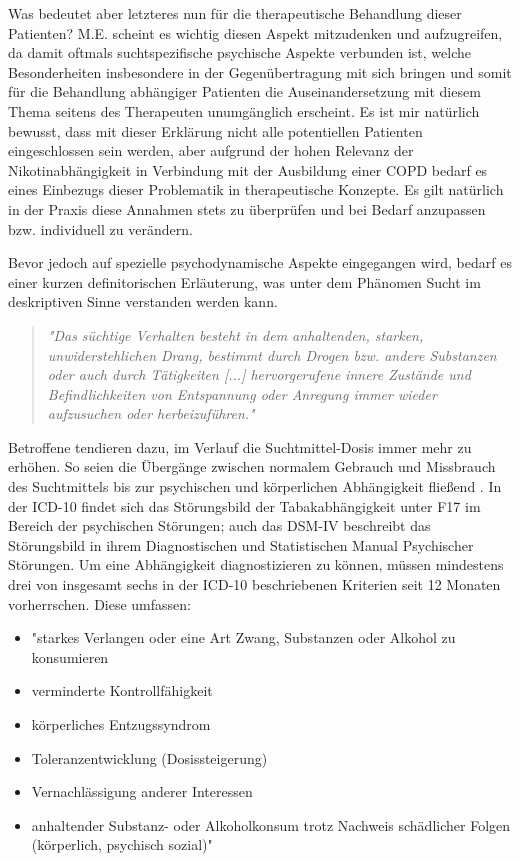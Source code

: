 Was bedeutet aber letzteres nun für die therapeutische Behandlung dieser Patienten? M.E. scheint es wichtig diesen Aspekt mitzudenken und aufzugreifen, da damit oftmals  suchtspezifische psychische Aspekte verbunden ist, welche Besonderheiten insbesondere in der Gegenübertragung mit sich bringen und somit für die Behandlung abhängiger Patienten die Auseinandersetzung mit diesem Thema seitens des Therapeuten unumgänglich erscheint. Es ist mir natürlich bewusst, dass mit dieser Erklärung nicht alle potentiellen Patienten eingeschlossen sein werden, aber aufgrund der hohen Relevanz der Nikotinabhängigkeit in Verbindung mit der Ausbildung einer COPD bedarf es eines Einbezugs dieser Problematik in therapeutische Konzepte. Es gilt natürlich in der Praxis diese Annahmen stets zu überprüfen und bei Bedarf anzupassen bzw. individuell zu verändern. 

Bevor jedoch auf spezielle psychodynamische Aspekte eingegangen wird, bedarf es einer kurzen definitorischen Erläuterung, was unter dem Phänomen Sucht im deskriptiven Sinne verstanden werden kann. 
\begin{quote}
\emph{"Das süchtige Verhalten besteht in dem anhaltenden, starken, unwiderstehlichen Drang, bestimmt durch Drogen bzw. andere Substanzen oder auch durch Tätigkeiten [...] hervorgerufene innere Zustände und Befindlichkeiten von Entspannung oder Anregung immer wieder aufzusuchen oder herbeizuführen."} \autocite[173]{mentzos2011} 
\end{quote}
Betroffene tendieren dazu, im Verlauf die Suchtmittel-Dosis immer mehr zu erhöhen. So seien die Übergänge zwischen normalem Gebrauch und Missbrauch des Suchtmittels bis zur psychischen und körperlichen Abhängigkeit fließend \autocite[vgl.][173]{mentzos2011}. In der ICD-10 findet sich das Störungsbild der Tabakabhängigkeit unter F17 im Bereich der psychischen Störungen; auch das DSM-IV beschreibt das Störungsbild in ihrem Diagnostischen und Statistischen Manual Psychischer Störungen. Um eine Abhängigkeit diagnostizieren zu können, müssen mindestens drei von insgesamt sechs in der ICD-10 beschriebenen Kriterien seit 12 Monaten vorherrschen. Diese umfassen:

\begin{itemize}
\item "starkes Verlangen oder eine Art Zwang, Substanzen oder Alkohol zu konsumieren
\item verminderte Kontrollfähigkeit
\item körperliches Entzugssyndrom
\item Toleranzentwicklung (Dosissteigerung)
\item Vernachlässigung anderer Interessen
\item anhaltender Substanz- oder Alkoholkonsum trotz Nachweis schädlicher Folgen (körperlich, psychisch sozial)" \autocite[315]{moeller2009}
\end{itemize}

